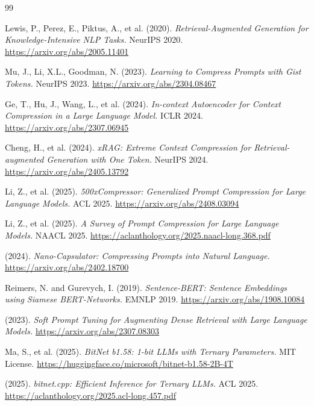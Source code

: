 \documentclass{article}
\begin{document}
\begin{thebibliography}{99}

Lewis, P., Perez, E., Piktus, A., et al. (2020).
\textit{Retrieval-Augmented Generation for Knowledge-Intensive NLP Tasks.}
NeurIPS 2020. \url{https://arxiv.org/abs/2005.11401}

Mu, J., Li, X.L., Goodman, N. (2023).
\textit{Learning to Compress Prompts with Gist Tokens.}
NeurIPS 2023. \url{https://arxiv.org/abs/2304.08467}

Ge, T., Hu, J., Wang, L., et al. (2024).
\textit{In-context Autoencoder for Context Compression in a Large Language Model.}
ICLR 2024. \url{https://arxiv.org/abs/2307.06945}

Cheng, H., et al. (2024).
\textit{xRAG: Extreme Context Compression for Retrieval-augmented Generation with One Token.}
NeurIPS 2024. \url{https://arxiv.org/abs/2405.13792}

Li, Z., et al. (2025).
\textit{500xCompressor: Generalized Prompt Compression for Large Language Models.}
ACL 2025. \url{https://arxiv.org/abs/2408.03094}

Li, Z., et al. (2025).
\textit{A Survey of Prompt Compression for Large Language Models.}
NAACL 2025. \url{https://aclanthology.org/2025.naacl-long.368.pdf}

(2024).
\textit{Nano-Capsulator: Compressing Prompts into Natural Language.}
\url{https://arxiv.org/abs/2402.18700}

Reimers, N. and Gurevych, I. (2019).
\textit{Sentence-BERT: Sentence Embeddings using Siamese BERT-Networks.}
EMNLP 2019. \url{https://arxiv.org/abs/1908.10084}

(2023).
\textit{Soft Prompt Tuning for Augmenting Dense Retrieval with Large Language Models.}
\url{https://arxiv.org/abs/2307.08303}

Ma, S., et al. (2025).
\textit{BitNet b1.58: 1-bit LLMs with Ternary Parameters.}
MIT License. \url{https://huggingface.co/microsoft/bitnet-b1.58-2B-4T}

(2025).
\textit{bitnet.cpp: Efficient Inference for Ternary LLMs.}
ACL 2025. \url{https://aclanthology.org/2025.acl-long.457.pdf}

\end{thebibliography}
\end{document}
